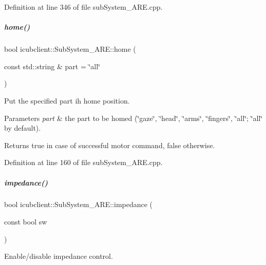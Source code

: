 Definition at line 346 of file sub\+System\+\_\+\+A\+R\+E.\+cpp.

\mbox{\label{group__icubclient__subsystems_ae328769c62775194ac87a2cb6143d3e2}} 
\subparagraph{\texorpdfstring{home()}{home()}}
{\footnotesize\ttfamily bool icubclient\+::\+Sub\+System\+\_\+\+A\+R\+E\+::home (\begin{DoxyParamCaption}\item[{const std\+::string \&}]{part = {\ttfamily \char`\"{}all\char`\"{}} }\end{DoxyParamCaption})}



Put the specified part ih home position. 


\begin{DoxyParams}{Parameters}
{\em part} & the part to be homed (\char`\"{}gaze\char`\"{}, \char`\"{}head\char`\"{}, \char`\"{}arms\char`\"{}, \char`\"{}fingers\char`\"{}, \char`\"{}all\char`\"{}; \char`\"{}all\char`\"{} by default). \\
\hline
\end{DoxyParams}
\begin{DoxyReturn}{Returns}
true in case of successful motor command, false otherwise. 
\end{DoxyReturn}


Definition at line 160 of file sub\+System\+\_\+\+A\+R\+E.\+cpp.

\mbox{\label{group__icubclient__subsystems_a3d47ce46a6a31949ad9da3faf1a0ca9f}} 
\subparagraph{\texorpdfstring{impedance()}{impedance()}}
{\footnotesize\ttfamily bool icubclient\+::\+Sub\+System\+\_\+\+A\+R\+E\+::impedance (\begin{DoxyParamCaption}\item[{const bool}]{sw }\end{DoxyParamCaption})}



Enable/disable impedance control. 


